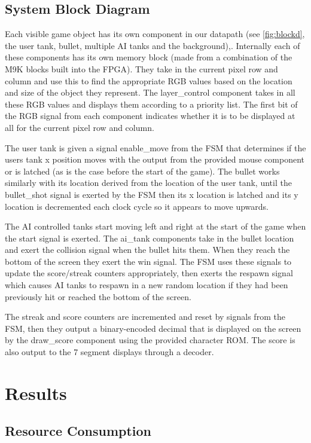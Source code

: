 \documentclass{article}
\begin{document}
\subsection{System Block Diagram}

Each visible game object has its own component in our datapath (see \ref{fig:blockd}, the user tank, bullet, multiple AI tanks and the background),. Internally each of these components has its own memory block (made from a combination of the M9K blocks built into the FPGA). They take in the current pixel row and column and use this to find the appropriate RGB values based on the location and size of the object they represent. The layer_control component takes in all these RGB values and displays them according to a priority list. The first bit of the RGB signal from each component indicates whether it is to be displayed at all for the current pixel row and column.

The user tank is given a signal enable_move from the FSM that determines if the users tank x position moves with the output from the provided mouse component or is latched (as is the case before the start of the game). The bullet works similarly with its location derived from the location of the user tank, until the bullet_shot signal is exerted by the FSM then its x location is latched and its y location is decremented each clock cycle so it appears to move upwards.

The AI controlled tanks start moving left and right at the start of the game when the start signal is exerted. The ai_tank components take in the bullet location and exert the collision signal when the bullet hits them. When they reach the bottom of the screen they exert the win signal. The FSM uses these signals to update the score/streak counters appropriately, then exerts the respawn signal which causes AI tanks to respawn in a new random location if they had been previously hit or reached the bottom of the screen.

The streak and score counters are incremented and reset by signals from the FSM, then they output a binary-encoded decimal that is displayed on the screen by the draw_score component using the provided character ROM. The score is also output to the 7 segment displays through a decoder.

\section{Results}

\subsection{Resource Consumption}
\end{document}
